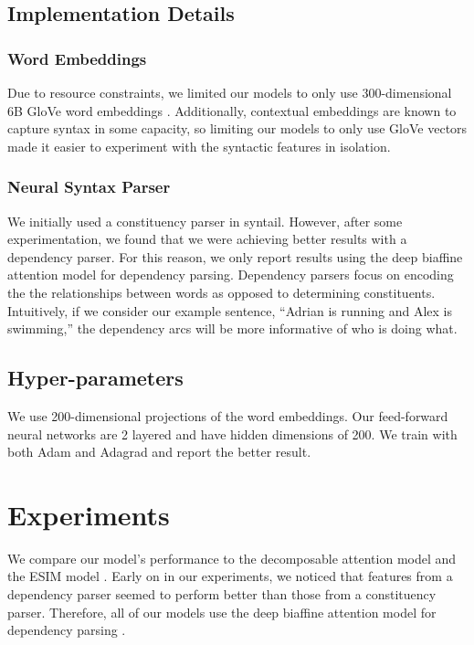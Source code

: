 \documentclass[11pt,a4paper]{article}
\begin{document}
\subsection{Implementation Details}

\subsubsection{Word Embeddings}

Due to resource constraints, we limited our models to only use 300-dimensional
6B GloVe word embeddings \citep{Pennington2014-uo}.
Additionally, contextual embeddings are known to capture syntax in some capacity,
so limiting our models to only use GloVe vectors
made it easier to experiment with the syntactic features in isolation.

\subsubsection{Neural Syntax Parser}

We initially used a constituency parser in syntail. However,
after some experimentation, we found that we were achieving better results
with a dependency parser.
For this reason, we only report results using the deep biaffine attention
model for dependency parsing.
Dependency parsers focus on encoding the
the relationships between words as opposed to determining constituents.
Intuitively, if we consider our example sentence, ``Adrian is running and Alex is swimming,''
the dependency arcs will be more informative of who is doing what.

\subsection{Hyper-parameters}

We use 200-dimensional projections of the word embeddings. Our feed-forward neural
networks are 2 layered and have hidden dimensions of 200. We train with both
Adam \citep{kingma2014adam} and Adagrad \citep{duchi2011adaptive} and report the
better result.

\section{Experiments}

We compare our model's performance to the decomposable attention model
\citep{Parikh2016-em} and the ESIM model \citep{Chen2016-wl}.
Early on in our experiments, we noticed that features from a dependency
parser seemed to perform better than those from a constituency parser.
Therefore, all of our models use the deep biaffine attention model for
dependency parsing \citep{Dozat2016-gs}.
\end{document}
